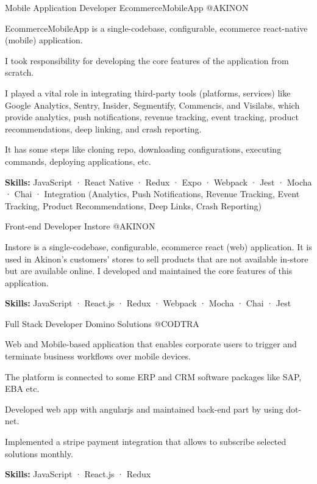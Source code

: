 \begin{cventries}
  \cventry
    {Mobile Application Developer} %
    {EcommerceMobileApp} %
    {@AKINON} %
    {}
    {
      \begin{cvitems} %
        \item {EcommerceMobileApp is a single-codebase, configurable, ecommerce react-native (mobile) application.}
        \item {I took responsibility for developing the core features of the application from scratch.}
        \item {I played a vital role in integrating third-party tools (platforms, services) like Google Analytics, Sentry, Insider, Segmentify, Commencis, and Visilabs, which provide analytics, push notifications, revenue tracking, event tracking, product recommendations, deep linking, and crash reporting.}
        \item {It has some steps like cloning repo, downloading configurations, executing commands, deploying applications, etc.}
        \item {\textbf {Skills:} JavaScript · React Native · Redux · Expo · Webpack · Jest · Mocha · Chai · Integration (Analytics, Push Notifications, Revenue Tracking, Event Tracking, Product Recommendations, Deep Links, Crash Reporting)}
      \end{cvitems}
    }

  \cventry
    {Front-end Developer} %
    {Instore} %
    {@AKINON} %
    {}
    {
      \begin{cvitems} %
        \item {Instore is a single-codebase, configurable, ecommerce react (web) application. It is used in Akinon's customers' stores to sell products that are not available in-store but are available online. I developed and maintained the core features of this application.}
        \item {\textbf {Skills:} JavaScript · React.js · Redux · Webpack · Mocha · Chai · Jest}
      \end{cvitems}
    }

  \cventry
    {Full Stack Developer} %
    {Domino Solutions} %
    {@CODTRA} %
    {}
    {
      \begin{cvitems} %
        \item {Web and Mobile-based application that enables corporate users to trigger and terminate business workflows over mobile devices.}
        \item {The platform is connected to some ERP and CRM software packages like SAP, EBA etc.}
        \item {Developed web app with angularjs and maintained back-end part by using dot-net.}
        \item {Implemented a stripe payment integration that allows to subscribe selected solutions monthly.}
        \item {\textbf {Skills:} JavaScript · React.js · Redux}
      \end{cvitems}
    }


\end{cventries}
